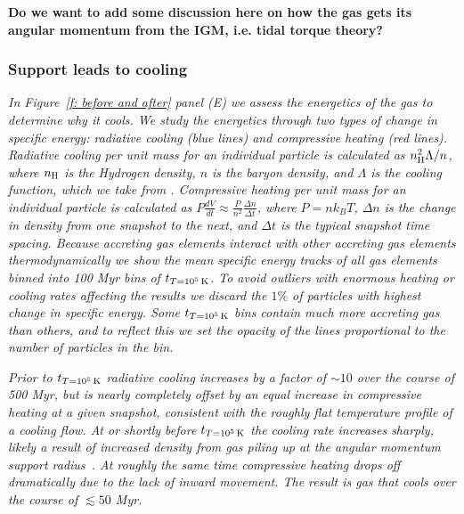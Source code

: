 \documentclass[fleqn,usenatbib]{mnras}
\newcommand{\tcon}{t_{T=10^5\,{\rm K}}}
\newcommand{\nH}{n_{\rm H}}
\begin{document}
\textbf{Do we want to add some discussion here on how the gas gets its angular momentum from the IGM, i.e. tidal torque theory?}

\subsubsection{Support leads to cooling}
\label{s: mechanics -- energy balance}

\textit{
In Figure~\ref{f: before and after} panel (E) we assess the energetics of the gas to determine why it cools.
We study the energetics through two types of change in specific energy: radiative cooling (blue lines) and compressive heating (red lines).
Radiative cooling per unit mass for an individual particle is calculated as $\nH^2 \Lambda / n$, where $\nH$ is the Hydrogen density, $n$ is the baryon density, and $\Lambda$ is the cooling function, which we take from \cite{Wiersma2009a}.
Compressive heating per unit mass for an individual particle is calculated as $P \frac{dV}{dt} \approx \frac{ P }{ n^2 } \frac{ \Delta n }{ \Delta t }$, where $P = n k_B T$, $\Delta n$ is the change in density from one snapshot to the next, and $\Delta t$ is the typical snapshot time spacing.
Because accreting gas elements interact with other accreting gas elements thermodynamically we show the mean specific energy tracks of all gas elements binned into 100 Myr bins of $\tcon$.
To avoid outliers with enormous heating or cooling rates affecting the results we discard the $1\%$ of particles with highest change in specific energy.
Some $\tcon$ bins contain much more accreting gas than others, and to reflect this we set the opacity of the lines proportional to the number of particles in the bin.
}

\textit{
Prior to $\tcon$ radiative cooling increases by a factor of $\sim 10$ over the course of 500 Myr, but is nearly completely offset by an equal increase in compressive heating at a given snapshot, consistent with the roughly flat temperature profile of a cooling flow.
At or shortly before $\tcon$ the cooling rate increases sharply, likely a result of increased density from gas piling up at the angular momentum support radius~\citep{Trapp2021}.
At roughly the same time compressive heating drops off dramatically due to the lack of inward movement.
The result is gas that cools over the course of $\lesssim 50$ Myr.
}
\end{document}
